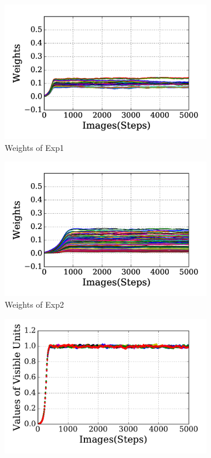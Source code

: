 \begin{figure}
	\centering
	\begin{subfigure}[t]{0.45\textwidth}
		\includegraphics[width=\textwidth]{pics_sdlm/30_exp_RBM/exp1_weights_non.png}
		\caption{Weights of Exp1}
	\end{subfigure}
	\begin{subfigure}[t]{0.45\textwidth}
		\includegraphics[width=\textwidth]{pics_sdlm/30_exp_RBM/exp2_weights_non.png}
		\caption{Weights of Exp2}
	\end{subfigure}
	\begin{subfigure}[t]{0.45\textwidth}
		\includegraphics[width=\textwidth]{pics_sdlm/30_exp_RBM/exp1_recon_non.pdf}

\end{subfigure}
\end{figure}
